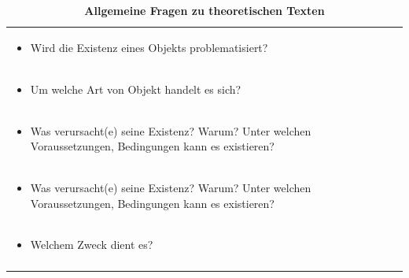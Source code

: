 \documentclass[]{book}
\providecommand{\tightlist}{%
  \setlength{\itemsep}{0pt}\setlength{\parskip}{0pt}}
\theoremstyle{definition}
\theoremstyle{definition}
\theoremstyle{definition}
\theoremstyle{remark}
\begin{document}
\begin{longtable}[]{@{}l@{}}
\caption{\textbf{\label{tab:theoretische-texte} Allgemeine Fragen zu
theoretischen Texten}}\tabularnewline
\toprule
\begin{minipage}[t]{0.97\columnwidth}\raggedright\strut
\begin{itemize}
\tightlist
\item
  Wird die Existenz eines Objekts problematisiert? \vspace{-6mm}
\end{itemize}\strut
\end{minipage}\tabularnewline
\begin{minipage}[t]{0.97\columnwidth}\raggedright\strut
\begin{itemize}
\tightlist
\item
  Um welche Art von Objekt handelt es sich? \vspace{-6mm}
\end{itemize}\strut
\end{minipage}\tabularnewline
\begin{minipage}[t]{0.97\columnwidth}\raggedright\strut
\begin{itemize}
\tightlist
\item
  Was verursacht(e) seine Existenz? Warum? Unter welchen
  Voraussetzungen, Bedingungen kann es existieren? \vspace{-6mm}
\end{itemize}\strut
\end{minipage}\tabularnewline
\begin{minipage}[t]{0.97\columnwidth}\raggedright\strut
\begin{itemize}
\tightlist
\item
  Was verursacht(e) seine Existenz? Warum? Unter welchen
  Voraussetzungen, Bedingungen kann es existieren? \vspace{-6mm}
\end{itemize}\strut
\end{minipage}\tabularnewline
\begin{minipage}[t]{0.97\columnwidth}\raggedright\strut
\begin{itemize}
\tightlist
\item
  Welchem Zweck dient es? \vspace{-6mm}
\end{itemize}\strut
\end{minipage}\tabularnewline
\begin{minipage}[t]{0.97\columnwidth}\raggedright\strut
\begin{itemize}

\end{itemize}
\end{minipage}
\end{longtable}
\end{document}
